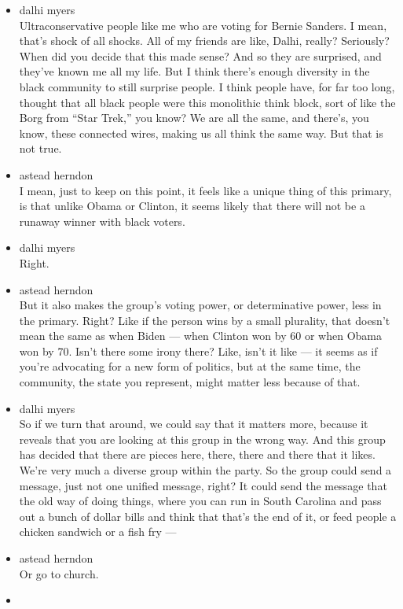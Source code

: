 \begin{itemize}
\item
  dalhi myers\\
  Ultraconservative people like me who are voting for Bernie Sanders. I
  mean, that's shock of all shocks. All of my friends are like, Dalhi,
  really? Seriously? When did you decide that this made sense? And so
  they are surprised, and they've known me all my life. But I think
  there's enough diversity in the black community to still surprise
  people. I think people have, for far too long, thought that all black
  people were this monolithic think block, sort of like the Borg from
  ``Star Trek,'' you know? We are all the same, and there's, you know,
  these connected wires, making us all think the same way. But that is
  not true.
\item
  astead herndon\\
  I mean, just to keep on this point, it feels like a unique thing of
  this primary, is that unlike Obama or Clinton, it seems likely that
  there will not be a runaway winner with black voters.
\item
  dalhi myers\\
  Right.
\item
  astead herndon\\
  But it also makes the group's voting power, or determinative power,
  less in the primary. Right? Like if the person wins by a small
  plurality, that doesn't mean the same as when Biden --- when Clinton
  won by 60 or when Obama won by 70. Isn't there some irony there? Like,
  isn't it like --- it seems as if you're advocating for a new form of
  politics, but at the same time, the community, the state you
  represent, might matter less because of that.
\item
  dalhi myers\\
  So if we turn that around, we could say that it matters more, because
  it reveals that you are looking at this group in the wrong way. And
  this group has decided that there are pieces here, there, there and
  there that it likes. We're very much a diverse group within the party.
  So the group could send a message, just not one unified message,
  right? It could send the message that the old way of doing things,
  where you can run in South Carolina and pass out a bunch of dollar
  bills and think that that's the end of it, or feed people a chicken
  sandwich or a fish fry ---
\item
  astead herndon\\
  Or go to church.
\item

\end{itemize}

